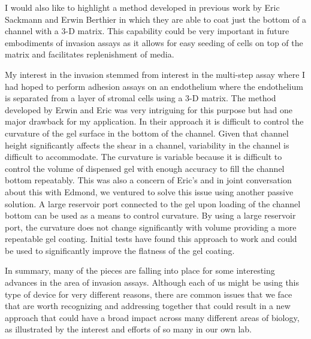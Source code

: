 I would also like to highlight a method developed in previous work by Eric Sackmann and Erwin Berthier in which they are able to coat just the bottom of a channel with a 3-D matrix. This capability could be very important in future embodiments of invasion assays as it allows for easy seeding of cells on top of the matrix and facilitates replenishment of media.

My interest in the invasion stemmed from interest in the multi-step assay where I had hoped to perform adhesion assays on an endothelium where the endothelium is separated from a layer of stromal cells using a 3-D matrix. The method developed by Erwin and Eric was very intriguing for this purpose but had one major drawback for my application. In their approach it is difficult to control the curvature of the gel surface in the bottom of the channel. Given that channel height significantly affects the shear in a channel, variability in the channel is difficult to accommodate. The curvature is variable because it is difficult to control the volume of dispensed gel with enough accuracy to fill the channel bottom repeatably. This was also a concern of Eric's and in joint conversation about this with Edmond, we ventured to solve this issue using another passive solution. A large reservoir port connected to the gel upon loading of the channel bottom can be used as a means to control curvature. By using a large reservoir port, the curvature does not change significantly with volume providing a more repeatable gel coating. Initial tests have found this approach to work and could be used to significantly improve the flatness of the gel coating.

In summary, many of the pieces are falling into place for some interesting advances in the area of invasion assays. Although each of us might be using this type of device for very different reasons, there are common issues that we face that are worth recognizing and addressing together that could result in a new approach that could have a broad impact across many different areas of biology, as illustrated by the interest and efforts of so many in our own lab.



